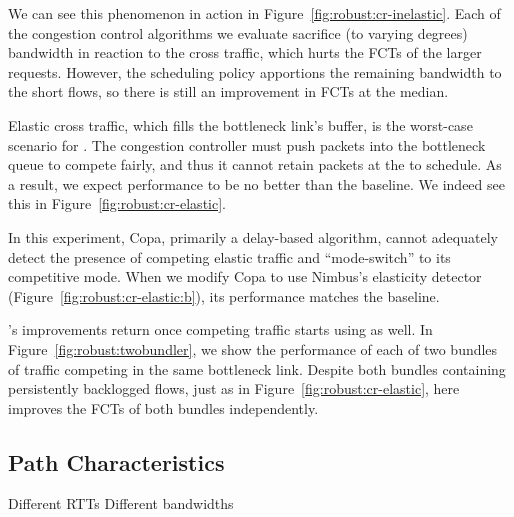 We can see this phenomenon in action in Figure~\ref{fig:robust:cr-inelastic}. 
Each of the congestion control algorithms we evaluate sacrifice (to varying degrees) bandwidth in reaction to the cross traffic, which hurts the FCTs of the larger requests.
However, the scheduling policy apportions the remaining bandwidth to the short flows, so there is still an improvement in FCTs at the median.



 Elastic cross traffic, which fills the bottleneck link's buffer, is the worst-case scenario for \name.
The congestion controller must push packets into the bottleneck queue to compete fairly, and thus it cannot retain packets at the \inbox to schedule.
As a result, we expect performance to be no better than the baseline.
We indeed see this in Figure~\ref{fig:robust:cr-elastic}.

In this experiment, Copa, primarily a delay-based algorithm, cannot adequately detect the presence of competing elastic traffic and ``mode-switch'' to its competitive mode. When we modify Copa to use Nimbus's elasticity detector (Figure~\ref{fig:robust:cr-elastic:b}), its performance matches the baseline.

 


 \name's improvements return once competing traffic starts using \name as well. In Figure~\ref{fig:robust:twobundler}, we show the performance of each of two bundles of traffic competing in the same bottleneck link. 
Despite both bundles containing persistently backlogged flows, just as in Figure~\ref{fig:robust:cr-elastic}, here \name improves the FCTs of both bundles independently.

\subsection{Path Characteristics}\label{s:robust:path}
 
\begin{outline}
\1 Different RTTs
\1 Different bandwidths
\end{outline}
